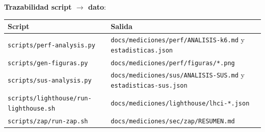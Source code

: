 \textbf{Trazabilidad script $\rightarrow$ dato}:

\begin{center}
\begin{tabular}{@{}lp{}@{}}
\toprule
\textbf{Script} & \textbf{Salida} \\
\midrule
\texttt{scripts/perf-analysis.py} & \texttt{docs/mediciones/perf/ANALISIS-k6.md} y \texttt{estadisticas.json} \\
\texttt{scripts/gen-figuras.py} & \texttt{docs/mediciones/perf/figuras/*.png} \\
\texttt{scripts/sus-analysis.py} & \texttt{docs/mediciones/sus/ANALISIS-SUS.md} y \texttt{estadisticas-sus.json} \\
\texttt{scripts/lighthouse/run-lighthouse.sh} & \texttt{docs/mediciones/lighthouse/lhci-*.json} \\
\texttt{scripts/zap/run-zap.sh} & \texttt{docs/mediciones/sec/zap/RESUMEN.md} \\
\bottomrule
\end{tabular}
\end{center}